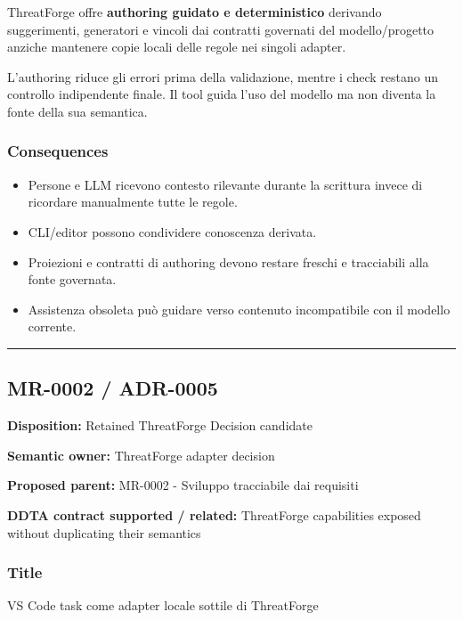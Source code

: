 \documentclass[
  10pt,
  a4paper,
]{article}
\providecommand{\tightlist}{%
  \setlength{\itemsep}{0pt}\setlength{\parskip}{0pt}}
\begin{document}
ThreatForge offre \textbf{authoring guidato e deterministico} derivando
suggerimenti, generatori e vincoli dai contratti governati del
modello/progetto anziche mantenere copie locali delle regole nei singoli
adapter.

L'authoring riduce gli errori prima della validazione, mentre i check
restano un controllo indipendente finale. Il tool guida l'uso del
modello ma non diventa la fonte della sua semantica.

\subsubsection{Consequences}\label{consequences-11}

\begin{itemize}
\tightlist
\item
  Persone e LLM ricevono contesto rilevante durante la scrittura invece
  di ricordare manualmente tutte le regole.
\item
  CLI/editor possono condividere conoscenza derivata.
\item
  Proiezioni e contratti di authoring devono restare freschi e
  tracciabili alla fonte governata.
\item
  Assistenza obsoleta può guidare verso contenuto incompatibile con il
  modello corrente.
\end{itemize}

\begin{center}\rule{0.5\linewidth}{0.5pt}\end{center}

\subsection{MR-0002 / ADR-0005}\label{mr-0002-adr-0005}

\textbf{Disposition:} Retained ThreatForge Decision candidate

\textbf{Semantic owner:} ThreatForge adapter decision

\textbf{Proposed parent:} MR-0002 - Sviluppo tracciabile dai requisiti

\textbf{DDTA contract supported / related:} ThreatForge capabilities
exposed without duplicating their semantics

\subsubsection{Title}\label{title-12}

VS Code task come adapter locale sottile di ThreatForge
\end{document}
